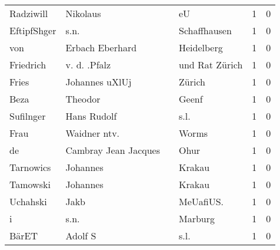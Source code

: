 \begin{tabular}{llllrr}
                Radziwill &                           Nikolaus &             &                                          eU &          1 &         0 \\
              EftipfShger &                               s.n. &             &                                Schaffhausen &          1 &         0 \\
                      von &                    Erbach Eberhard &             &                                  Heidelberg &          1 &         0 \\
                Friedrich &                       v. d. .Pfalz &             &                              und Rat Zürich &          1 &         0 \\
                    Fries &                     Johannes uXlUj &             &                                      Zürich &          1 &         0 \\
                     Beza &                            Theodor &             &                                       Geenf &          1 &         0 \\
                Sufilnger &                        Hans Rudolf &             &                                        s.l. &          1 &         0 \\
                     Frau &                       Waidner ntv. &             &                                       Worms &          1 &         0 \\
                       de &               Cambray Jean Jacques &             &                                        Ohur &          1 &         0 \\
                Tarnowics &                           Johannes &             &                                      Krakau &          1 &         0 \\
                 Tamowski &                           Johannes &             &                                      Krakau &          1 &         0 \\
                 Uchahski &                               Jakb &             &                                  MeUafiUS.  &          1 &         0 \\
                        i &                               s.n. &             &                                     Marburg &          1 &         0 \\
                    BärET &                            Adolf S &             &                                        s.l. &          1 &         0 \\

\end{tabular}
